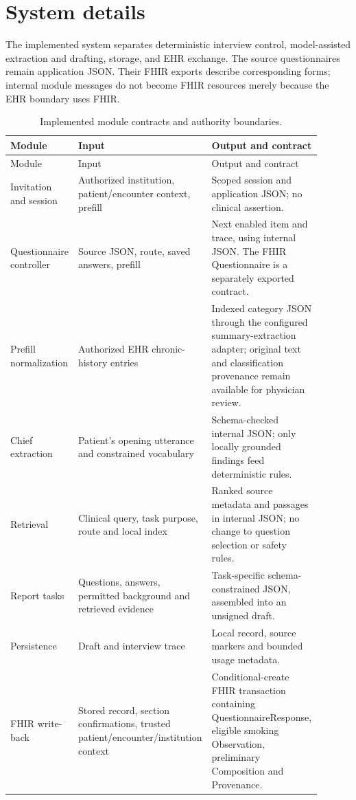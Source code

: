 \section{System details}\label{sup:s1}
The implemented system separates deterministic interview control, model-assisted
extraction and drafting, storage, and EHR exchange. The source questionnaires remain
application JSON. Their FHIR exports describe corresponding forms; internal module
messages do not become FHIR resources merely because the EHR boundary uses FHIR.

\begin{longtable}{p{0.18\linewidth}p{0.32\linewidth}p{0.40\linewidth}}
\caption{Implemented module contracts and authority boundaries.}\label{sup:contracts}\\
\hline Module & Input & Output and contract \\\hline\endfirsthead
\hline Module & Input & Output and contract \\\hline\endhead
Invitation and session & Authorized institution, patient/encounter context, prefill & Scoped session and application JSON; no clinical assertion. \\
Questionnaire controller & Source JSON, route, saved answers, prefill & Next enabled item and trace, using internal JSON. The FHIR Questionnaire is a separately exported contract. \\
Prefill normalization & Authorized EHR chronic-history entries & Indexed category JSON through the configured summary-extraction adapter; original text and classification provenance remain available for physician review. \\
Chief extraction & Patient's opening utterance and constrained vocabulary & Schema-checked internal JSON; only locally grounded findings feed deterministic rules. \\
Retrieval & Clinical query, task purpose, route and local index & Ranked source metadata and passages in internal JSON; no change to question selection or safety rules. \\
Report tasks & Questions, answers, permitted background and retrieved evidence & Task-specific schema-constrained JSON, assembled into an unsigned draft. \\
Persistence & Draft and interview trace & Local record, source markers and bounded usage metadata. \\
FHIR write-back & Stored record, section confirmations, trusted patient/encounter/institution context & Conditional-create FHIR transaction containing QuestionnaireResponse, eligible smoking Observation, preliminary Composition and Provenance. \\
\hline
\end{longtable}

